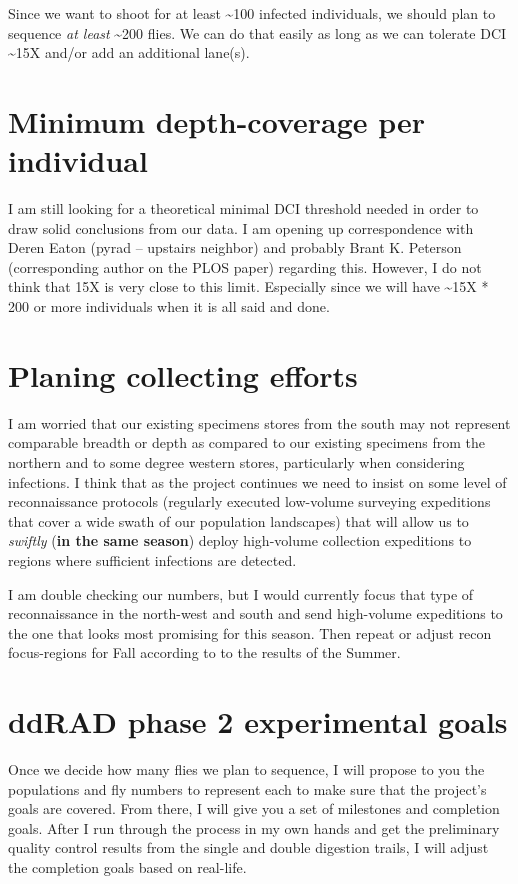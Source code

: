 \documentclass[letterpaper]{scrartcl}
\begin{document}
Since we want to shoot for at least \textasciitilde{}100 infected
individuals, we should plan to sequence \emph{at least}
\textasciitilde{}200 flies. We can do that easily as long as we can
tolerate DCI \textasciitilde{}15X and/or add an additional lane(s).

\section{Minimum depth-coverage per
individual}\label{minimum-depth-coverage-per-individual}

I am still looking for a theoretical minimal DCI threshold needed in
order to draw solid conclusions from our data. I am opening up
correspondence with Deren Eaton (pyrad -- upstairs neighbor) and
probably Brant K. Peterson (corresponding author on the PLOS paper)
regarding this. However, I do not think that 15X is very close to this
limit. Especially since we will have \textasciitilde{}15X * 200 or more
individuals when it is all said and done.

\section{Planing collecting efforts}\label{planing-collecting-efforts}

I am worried that our existing specimens stores from the south may not
represent comparable breadth or depth as compared to our existing
specimens from the northern and to some degree western stores,
particularly when considering infections. I think that as the project
continues we need to insist on some level of reconnaissance protocols
(regularly executed low-volume surveying expeditions that cover a wide
swath of our population landscapes) that will allow us to \emph{swiftly}
(\textbf{in the same season}) deploy high-volume collection expeditions
to regions where sufficient infections are detected.

I am double checking our numbers, but I would currently focus that type
of reconnaissance in the north-west and south and send high-volume
expeditions to the one that looks most promising for this season. Then
repeat or adjust recon focus-regions for Fall according to to the
results of the Summer.

\section{ddRAD phase 2 experimental
goals}\label{ddrad-phase-2-experimental-goals}

Once we decide how many flies we plan to sequence, I will propose to you
the populations and fly numbers to represent each to make sure that the
project's goals are covered. From there, I will give you a set of
milestones and completion goals. After I run through the process in my
own hands and get the preliminary quality control results from the
single and double digestion trails, I will adjust the completion goals
based on real-life.
\end{document}
